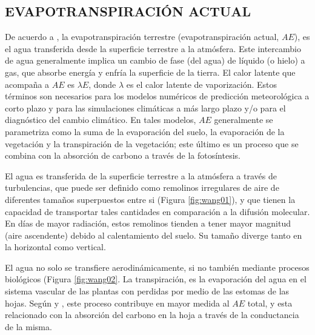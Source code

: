 \documentclass[12pt]{article}
\begin{document}
\thispagestyle{empty}

\subsection{EVAPOTRANSPIRACIÓN ACTUAL}

De acuerdo a \citet{wang2012review}, la evapotranspiración terrestre (evapotranspiración actual, $AE$), es el agua transferida desde la superficie terrestre a la atmósfera. Este intercambio de agua generalmente implica un cambio de fase (del agua) de líquido (o hielo) a gas, que absorbe energía y enfría la superficie de la tierra. El calor latente que acompaña a $AE$ es $\lambda E$, donde $\lambda$ es el calor latente de vaporización. Estos términos son necesarios para los modelos numéricos de predicción meteorológica a corto plazo y para las simulaciones climáticas a más largo plazo y/o para el diagnóstico del cambio climático. En tales modelos, $AE$ generalmente se parametriza como la suma de la evaporación del suelo, la evaporación de la vegetación y la transpiración de la vegetación; este último es un proceso que se combina con la absorción de carbono a través de la fotosíntesis.

\vspace*{.5cm}

\thispagestyle{empty}

\clearpage
El agua es transferida de la superficie terrestre a la atmósfera a través de turbulencias, que puede ser definido como remolinos irregulares de aire de diferentes tamaños superpuestos entre si (Figura \ref{fig:wang01}), y que tienen la capacidad de transportar tales cantidades en comparación a la difusión molecular. En días de mayor radiación, estos remolinos tienden a tener mayor magnitud (aire ascendente) debido al calentamiento del suelo. Su tamaño diverge tanto en la horizontal como vertical. 

El agua no solo se transfiere aerodinámicamente, si no también mediante procesos biológicos (Figura \ref{fig:wang02}. La transpiración, es la evaporación del agua en el sistema vascular de las plantas con perdidas por medio de las estomas de las hojas. Según \citet{dirmeyer2006gswp} y \citet{lawrence2007partitioning}, este proceso contribuye en mayor medida al $AE$ total, y esta relacionado con la absorción del carbono en la hoja a través de la conductancia de la misma.
\end{document}
